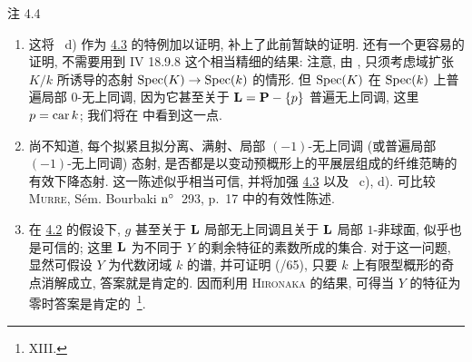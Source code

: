 \begin{enonce*}[remark]{注 4.4}
\begin{enumerate}
\renewcommand{\theenumi}{\alph{enumi}}
\renewcommand{\labelenumi}{\theenumi)}
\item 这将 ~d) 作为 \hyperref[XV.cor4.3]{4.3} 的特例加以证明, 补上了此前暂缺的证明. %
还有一个更容易的证明, 不需要用到 \EGA IV 18.9.8 这个相当精细的\pageoriginale 结果: 注意, 由 , 只须考虑域扩张 $K/k$ 所诱导的态射 $\operatorname{Spec}(K)\rightarrow \operatorname{Spec}(k)$ 的情形. 但 $\operatorname{Spec}(K)$ 在 $\operatorname{Spec}(k)$ 上普遍局部 $0$-无上同调, 因为它甚至关于 $\mathbf{L}=\mathbf{P}-\{p\}$ 普遍无上同调, 这里 $p=\operatorname{car} k$; 我们将在  中看到这一点.

\item 尚不知道, 每个拟紧且拟分离、满射、局部 $(-1)$-无上同调 (或普遍局部 $(-1)$-无上同调) 态射, 是否都是以变动预概形上的平展层组成的纤维范畴的有效下降态射. 这一陈述似乎相当可信, 并将加强 \hyperref[XV.cor4.3]{4.3} 以及 ~c), d). %
可比较 \textsc{Murre}, Sém. Bourbaki ${\rm n^{\circ}}$~293, p.~17 中的有效性陈述.

\item 在 \hyperref[XV.cor4.2]{4.2} 的假设下, $g$ 甚至关于 $\mathbf{L}$ 局部无上同调且关于 $\mathbf{L}$ 局部 $1$-非球面, 似乎也是可信的; 这里 $\mathbf{L}$ 为不同于 $Y$ 的剩余特征的素数所成的集合. 对于这一问题, 显然可假设 $Y$ 为代数闭域 $k$ 的谱, 并可证明 (/65), 只要 $k$ 上有限型概形的奇点消解成立, 答案就是肯定的. 因而利用 \textsc{Hironaka} 的结果, 可得当 $Y$ 的特征为零时答案是肯定的~\footnote[1]{\Cf {} XIII.}.
\end{enumerate}
\end{enonce*}



